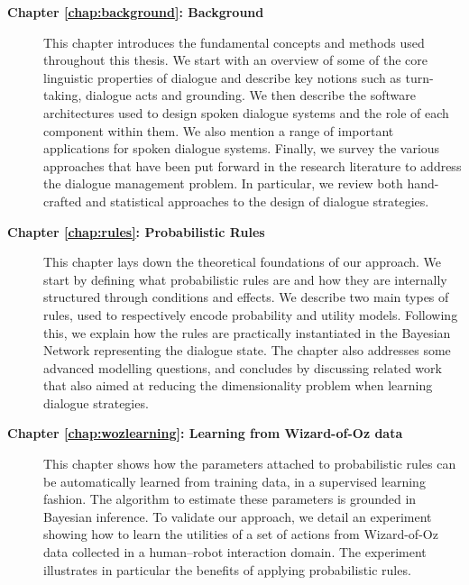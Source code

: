 \begin{description}
  \item[\textbf{Chapter \ref{chap:background}: Background}] \hfill  \vspace{2mm}
  
This chapter introduces the fundamental concepts and methods used throughout this thesis. We start with an overview of some of the core linguistic properties of dialogue and describe key notions such as turn-taking, dialogue acts and grounding.  We then describe the software architectures used to design spoken dialogue systems and the role of each component within them.  We also mention a range of important applications for spoken dialogue systems. Finally, we survey the various approaches that have been put forward in the research literature to address the dialogue management problem.  In particular, we review both hand-crafted and statistical approaches to the design of dialogue strategies.   \vspace{2mm}

  \item[\textbf{Chapter \ref{chap:rules}: Probabilistic Rules}] \hfill \vspace{2mm}
 
  This chapter lays down the theoretical foundations of our approach.  We start by defining what probabilistic rules are and how they are internally structured through conditions and effects.  We describe two main types of rules, used to respectively encode probability and utility models. Following this, we explain how the rules are practically instantiated in the Bayesian Network representing the dialogue state.  The chapter also addresses some advanced modelling questions, and concludes by discussing related work that also aimed at reducing the dimensionality problem when learning dialogue strategies.  \vspace{2mm}
  
  \item[\textbf{Chapter \ref{chap:wozlearning}: Learning from Wizard-of-Oz data}] \hfill  \vspace{2mm}
  
 This chapter shows how the parameters attached to probabilistic rules can be automatically learned from training data, in a supervised learning fashion. The algorithm to estimate these parameters is grounded in Bayesian inference.  To validate our approach, we detail an experiment showing how to learn the utilities of a set of actions from Wizard-of-Oz data collected in a human--robot interaction domain.  The experiment illustrates in particular the benefits of applying probabilistic rules.  \vspace{2mm}


\end{description}
